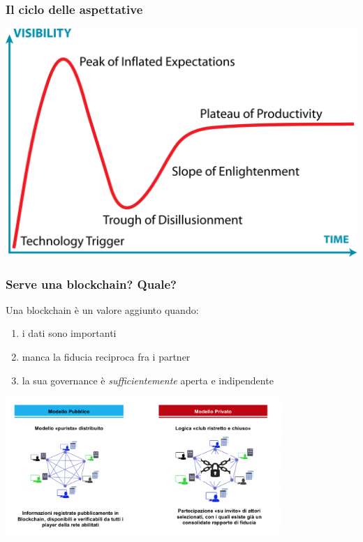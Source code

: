 \documentclass[11pt]{beamer}  %
\begin{document}
\begin{frame}\frametitle{Il ciclo delle aspettative}

  \begin{center}
    \includegraphics[width=\textwidth,clip=false]{pictures/hype-cycle.png}
  \end{center}

\end{frame}

\begin{frame}\frametitle{Serve una blockchain? Quale?}

  Una blockchain \`e un valore aggiunto quando:
  \begin{enumerate}
  \item i dati sono importanti
  \item manca la fiducia reciproca fra i partner
  \item la sua governance \`e \emph{sufficientemente} aperta e indipendente
  \end{enumerate}

  \medskip

  \begin{center}
    \includegraphics[width=10.5cm,clip=false]{pictures/blockchain-private-e-pubbliche.png}
  \end{center}

\end{frame}
\end{document}
